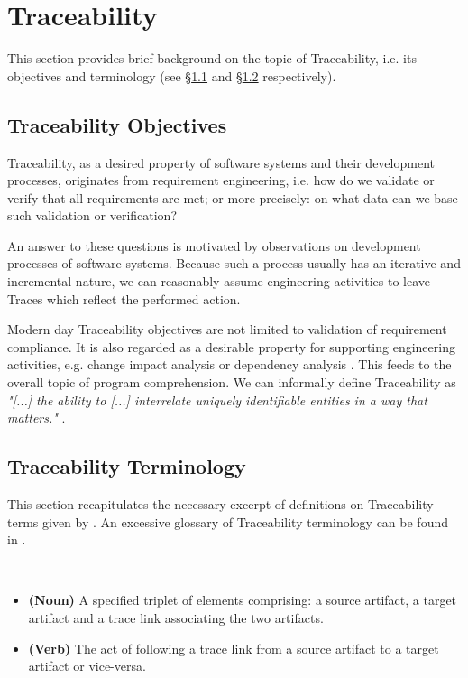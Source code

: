 \section{Traceability}
\label{section:Traceability}
This section provides brief background on the topic of \gls{Traceability}, i.e. its objectives and terminology (see §\ref{subsection:TraceabilityObjectives} and §\ref{subsection:TraceabilityTerminology} respectively).

\subsection{Traceability Objectives}
\label{subsection:TraceabilityObjectives}
\Gls{Traceability}, as a desired property of software systems and their development processes, originates from requirement engineering, i.e.
how do we validate or verify that all requirements are met;
or more precisely: on what data can we base such validation or verification?
\cite{Winkler:2010:STR:1861285.1861287}

An answer to these questions is motivated by observations on development processes of software systems.
Because such a process usually has an iterative and incremental nature, we can reasonably assume engineering activities to leave \glspl{Trace} which reflect the performed action.

Modern day \gls{Traceability} objectives are not limited to validation of requirement compliance.
It is also regarded as a desirable property for supporting engineering activities, e.g. change impact analysis or dependency analysis \cite{DBLP:books/daglib/p/GotelCHZEGDAMM12} \cite{Gotel94ananalysis}.
This feeds to the overall topic of program comprehension.
We can informally define \gls{Traceability} as \textit{"[...] the ability to [...] interrelate uniquely identifiable
entities in a way that matters."} \cite{PaigeOKZPC2010} \cite{Winkler:2010:STR:1861285.1861287}.


\subsection{Traceability Terminology}
\label{subsection:TraceabilityTerminology}
This section recapitulates the necessary excerpt of definitions on \gls{Traceability} terms given by \cite{DBLP:books/daglib/p/GotelCHZEGDAMM12}.
An excessive glossary of \gls{Traceability} terminology can be found in \cite{TraceabilityGlossary}.

\begin{definition}[Trace]
~
\begin{itemize}
\item
\textbf{(Noun)}
A specified triplet of elements comprising: a source artifact, a target artifact and a trace link associating the two artifacts.
\cite{DBLP:books/daglib/p/GotelCHZEGDAMM12}

\item
\textbf{(Verb)}
The act of following a trace link from a source artifact to a target artifact or vice-versa.
\cite{DBLP:books/daglib/p/GotelCHZEGDAMM12}
\end{itemize}
\end{definition}

